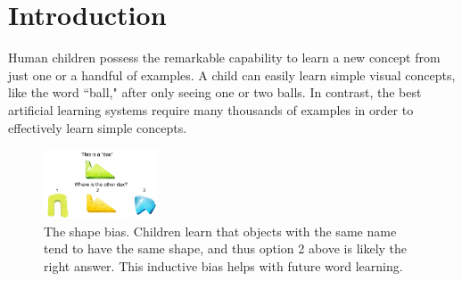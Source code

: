 \section{Introduction}

Human children possess the remarkable capability to learn a new concept from just one or a
handful of examples. A child can easily learn simple visual concepts, like the word ``ball,"
after only seeing one or two balls.
In contrast, the best artificial learning systems require many thousands of examples
in order to effectively learn simple concepts.
\begin{figure}[h!]
    \begin{center}
        \includegraphics[width=0.3\textwidth]{figures/shape_bias_demo.pdf}
    \end{center}
    \caption{The shape bias. Children learn that objects with the same name tend to have the
    same shape, and thus option 2 above is likely the right answer. This
    inductive bias helps with future word learning.}
    \label{fig:shape_bias_demo}
\end{figure}

